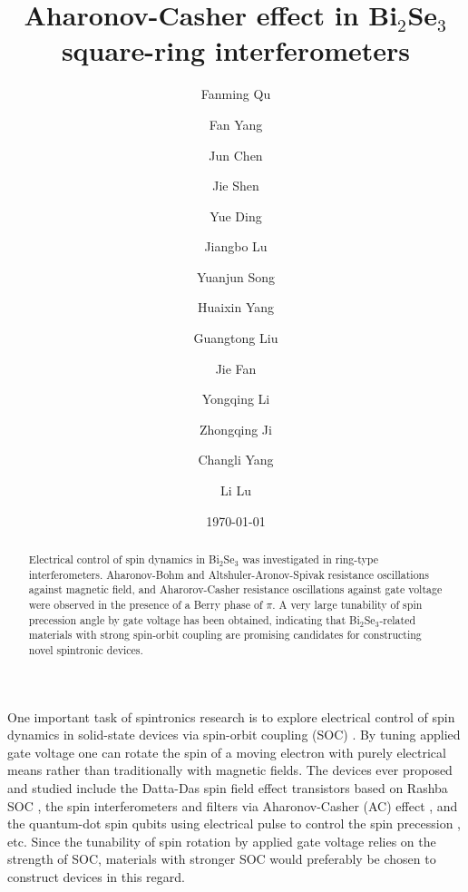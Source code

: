 {\begin{enumerate}
\title{Aharonov-Casher effect in Bi$_2$Se$_3$ square-ring interferometers}
\author{Fanming Qu}
\author{Fan Yang}
\author{Jun Chen}
\author{Jie Shen}
\author{Yue Ding}
\author{Jiangbo Lu}
\author{Yuanjun Song}
\author{Huaixin Yang}
\author{Guangtong Liu}
\author{Jie Fan}
\author{Yongqing Li}
\author{Zhongqing Ji}
\author{Changli Yang}
\author{Li Lu}
\date{\today}
\begin{abstract}
Electrical control of spin dynamics in Bi$_2$Se$_3$ was investigated in ring-type interferometers. Aharonov-Bohm and Altshuler-Aronov-Spivak resistance oscillations against magnetic field, and Aharorov-Casher resistance oscillations against gate voltage were observed in the presence of a Berry phase of $\pi$. A very large tunability of spin precession angle by gate voltage has been obtained, indicating that Bi$_2$Se$_3$-related materials with strong spin-orbit coupling are promising candidates for constructing novel spintronic devices.
\end{abstract}
\maketitle
One important task of spintronics research is to explore electrical control of spin dynamics in solid-state devices via spin-orbit coupling (SOC) \cite{spintronics}. By tuning applied gate voltage one can rotate the spin of a moving electron with purely electrical means rather than traditionally with magnetic fields. The devices ever proposed and studied include the Datta-Das spin field effect transistors based on Rashba SOC \cite{Rashba, Rashba2}, the spin interferometers and filters \cite{Rashba2, Rashba3, Rashba4, Rashba5, Rashba6} via Aharonov-Casher (AC) effect \cite{AC}, and the quantum-dot spin qubits using electrical pulse to control the spin precession \cite{QT, QT2, QT3}, etc. Since the tunability of spin rotation by applied gate voltage relies on the strength of SOC, materials with stronger SOC would preferably be chosen to construct devices in this regard.

\end{enumerate}}
